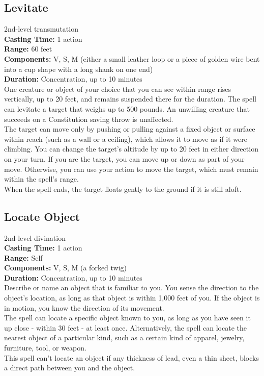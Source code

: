 \documentclass[11pt, A4paper, english]{article}
\begin{document}
		\subsection{Levitate}
2nd-level transmutation \\
\textbf{Casting Time:} 1 action \\
\textbf{Range:} 60 feet \\
\textbf{Components:} V, S, M (either a small leather loop or a piece of golden wire bent into a cup shape with a long shank on one end) \\
\textbf{Duration:} Concentration, up to 10 minutes \\
One creature or object of your choice that you can see within range rises vertically, up to 20 feet, and remains suspended there for the duration. The spell can levitate a target that weighs up to 500 pounds. An unwilling creature that succeeds on a Constitution saving throw is unaffected. \\
The target can move only by pushing or pulling against a fixed object or surface within reach (such as a wall or a ceiling), which allows it to move as if it were climbing. You can change the target’s altitude by up to 20 feet in either direction on your turn. If you are the target, you can move up or down as part of your move. Otherwise, you can use your action to move the target, which must remain within the spell’s range. \\
When the spell ends, the target floats gently to the ground if it is still aloft.

		\subsection{Locate Object}
2nd-level divination \\
\textbf{Casting Time:} 1 action \\
\textbf{Range:} Self \\
\textbf{Components:} V, S, M (a forked twig) \\
\textbf{Duration:} Concentration, up to 10 minutes \\
Describe or name an object that is familiar to you. You sense the direction to the object’s location, as long as that object is within 1,000 feet of you. If the object is in motion, you know the direction of its movement. \\
The spell can locate a specific object known to you, as long as you have seen it up close - within 30 feet - at least once. Alternatively, the spell can locate the nearest object of a particular kind, such as a certain kind of apparel, jewelry, furniture, tool, or weapon. \\
This spell can’t locate an object if any thickness of lead, even a thin sheet, blocks a direct path between you and the object.
\end{document}
